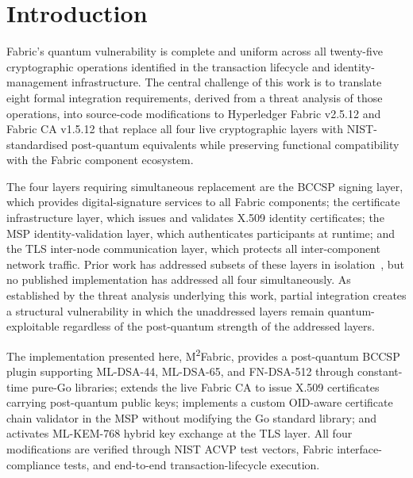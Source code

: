 \documentclass{ieeetj}
\newcommand{\mfabric}{M\textsuperscript{2}Fabric}
\begin{document}
\maketitle

\section{Introduction} \label{sec:intro}
 Fabric's quantum vulnerability is complete and
uniform across all twenty-five cryptographic operations identified in the
transaction lifecycle and identity-management infrastructure. The central
challenge of this work is to translate eight formal integration requirements,
derived from a threat analysis of those operations, into source-code
modifications to Hyperledger Fabric v2.5.12 and Fabric CA v1.5.12 that replace
all four live cryptographic layers with NIST-standardised post-quantum
equivalents while preserving functional compatibility with the Fabric component
ecosystem.

The four layers requiring simultaneous replacement are the BCCSP signing layer,
which provides digital-signature services to all Fabric components; the
certificate infrastructure layer, which issues and validates X.509 identity
certificates; the MSP identity-validation layer, which authenticates
participants at runtime; and the TLS inter-node communication layer, which
protects all inter-component network traffic. Prior work has addressed subsets
of these layers in isolation~\cite{holcomb2021, hu2025prototype, abbas2025}, but
no published implementation has addressed all four simultaneously. As
established by the threat analysis underlying this work, partial integration
creates a structural vulnerability in which the unaddressed layers remain
quantum-exploitable regardless of the post-quantum strength of the addressed
layers.

The implementation presented here, \mfabric{}, provides a post-quantum BCCSP
plugin supporting ML-DSA-44, ML-DSA-65, and FN-DSA-512 through constant-time
pure-Go libraries; extends the live Fabric CA to issue X.509 certificates
carrying post-quantum public keys; implements a custom OID-aware certificate
chain validator in the MSP without modifying the Go standard library; and
activates ML-KEM-768 hybrid key exchange at the TLS layer. All four
modifications are verified through NIST ACVP test vectors, Fabric
interface-compliance tests, and end-to-end transaction-lifecycle execution.
\end{document}
